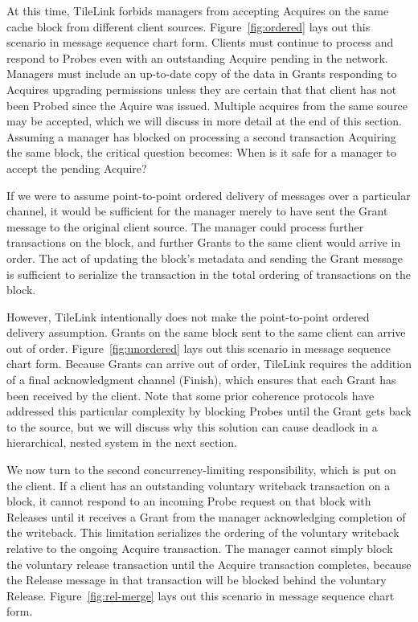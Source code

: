 At this time, TileLink forbids managers from accepting Acquires on the same cache block from different client sources.
Figure~\ref{fig:ordered} lays out this scenario in message sequence chart form.
Clients must continue to process and respond to Probes even with an outstanding Acquire pending in the network.
Managers must include an up-to-date copy of the data in Grants responding to Acquires upgrading permissions unless they are certain that that
client has not been Probed since the Aquire was issued.
Multiple acquires from the same source may be accepted, which we will discuss in more detail at the end of this section.
Assuming a manager has blocked on processing a second transaction Acquiring the same block, the critical question becomes: When is it safe for a manager to accept the pending Acquire?

If we were to assume point-to-point ordered delivery of messages over a particular channel,
it would be sufficient for the manager merely to have sent the Grant message to the original client source.
The manager could process further transactions on the block, and further Grants to the same client would arrive in order.
The act of updating the block's metadata and sending the Grant message is sufficient to serialize the transaction in the total ordering of transactions on the block.

However, TileLink intentionally does not make the point-to-point ordered delivery assumption.
Grants on the same block sent to the same client can arrive out of order.
Figure~\ref{fig:unordered} lays out this scenario in message sequence chart form.
Because Grants can arrive out of order, TileLink requires the addition of a final acknowledgment channel (Finish), which ensures that each Grant has been received by the client.
Note that some prior coherence protocols have addressed this particular complexity by blocking Probes until the Grant gets back to the source, but we will discuss why this solution can
cause deadlock in a hierarchical, nested system in the next section.

We now turn to the second concurrency-limiting responsibility, which is put on the client.
If a client has an outstanding voluntary writeback transaction on a block,
it cannot respond to an incoming Probe request on that block with Releases until it receives a Grant from the manager acknowledging completion of the writeback.
This limitation serializes the ordering of the voluntary writeback relative to the ongoing Acquire transaction.
The manager cannot simply block the voluntary release transaction until the Acquire transaction completes, because the Release message in that transaction will be
blocked behind the voluntary Release.
Figure~\ref{fig:rel-merge} lays out this scenario in message sequence chart form.

